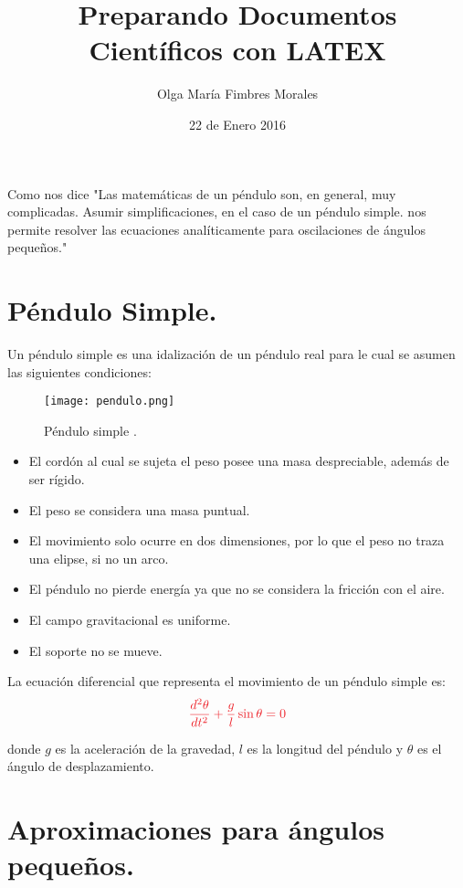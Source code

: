 \documentclass[12pt]{article}
\title{Preparando Documentos Científicos con LATEX}
\author{Olga María Fimbres Morales}
\date{22 de Enero 2016}
\begin{document}
\maketitle
\pagebreak

Como nos dice \cite{Wik} "Las matemáticas de un péndulo son, en general, muy complicadas. Asumir simplificaciones, en el caso de un péndulo simple. nos permite resolver las ecuaciones analíticamente para oscilaciones de ángulos pequeños."
\section{Péndulo Simple.}


Un péndulo simple es una idalización de un péndulo real para le cual se  asumen las siguientes condiciones:\\
\begin{wrapfigure}{r}{6cm}
	\begin{center}
      \texttt{[image: pendulo.png]}
      \caption{Péndulo simple \cite{Img1}.}
    \end{center}
\end{wrapfigure}
\begin{itemize}
\item El cordón al cual se sujeta el peso posee una masa despreciable, además de ser rígido.
\item El peso se considera una masa puntual.
\item El movimiento solo ocurre en dos dimensiones, por lo que el peso no traza una elipse, si no un arco.
\item El péndulo no pierde energía ya que no se considera la fricción con el aire.
\item El campo gravitacional es uniforme.
\item El soporte no se mueve.
\end{itemize}

La ecuación diferencial que representa el movimiento de un péndulo simple es:
\begin{equation}
\textcolor{Red}{\frac{d^2 \theta}{dt^2} + \frac{g}{l}\sin\theta = 0}
\end{equation}

donde $g$ es la aceleración de la gravedad, $l$ es la longitud del péndulo y $\theta$ es el ángulo de desplazamiento.

\pagebreak
\section{Aproximaciones para ángulos pequeños.}
\end{document}
